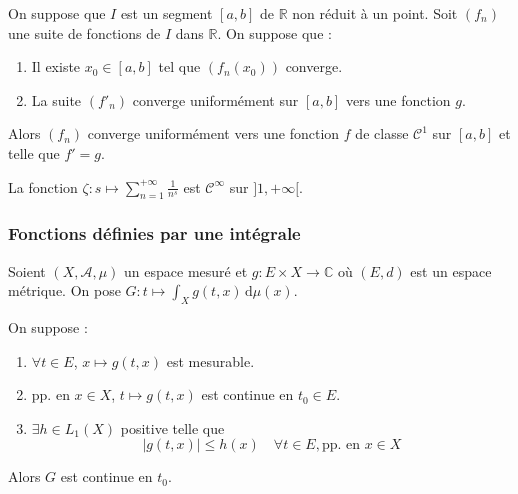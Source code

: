 	\begin{proposition}
		On suppose que $I$ est un segment $[a,b]$ de $\mathbb{R}$ non réduit à un point. Soit $(f_n)$ une suite de fonctions de $I$ dans $\mathbb{R}$. On suppose que :
		\begin{enumerate}[label=(\roman*)]
			\item Il existe $x_0 \in [a,b]$ tel que $(f_n(x_0))$ converge.
			\item La suite $(f'_n)$ converge uniformément sur $[a,b]$ vers une fonction $g$.
		\end{enumerate}
		Alors $(f_n)$ converge uniformément vers une fonction $f$ de classe $\mathcal{C}^1$ sur $[a,b]$ et telle que $f'=g$.
	\end{proposition}


	\begin{example}
		La fonction $\zeta : s \mapsto \sum_{n=1}^{+\infty} \frac{1}{n^s}$ est $\mathcal{C}^\infty$ sur $]1,+\infty[$.
	\end{example}

	\subsubsection{Fonctions définies par une intégrale}


	Soient $(X, \mathcal{A}, \mu)$ un espace mesuré et $g : E \times X \rightarrow \mathbb{C}$ où $(E, d)$ est un espace métrique. On pose $G : t \mapsto \int_X g(t, x) \, \mathrm{d}\mu(x)$.

	\begin{theorem}
		On suppose :
		\begin{enumerate}[label=(\roman*)]
			\item $\forall t \in E$, $x \mapsto g(t,x)$ est mesurable.
			\item pp. en $x \in X$, $t \mapsto g(t,x)$ est continue en $t_0 \in E$.
			\item $\exists h \in L_1(X)$ positive telle que
			\[ |g(t,x)| \leq h(x) \quad \forall t \in E, \text{pp. en } x \in X \]
		\end{enumerate}
		Alors $G$ est continue en $t_0$.
	\end{theorem}

